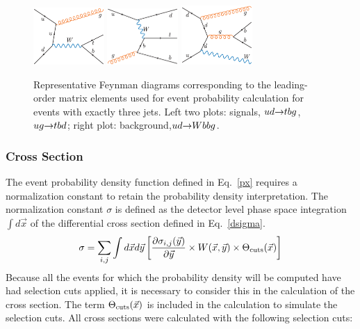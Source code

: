 \begin{figure}[!h!tbp]
\includegraphics[width=0.24\textwidth]{figures/feynman/tbg}
\hspace{0.2in}
\includegraphics[width=0.24\textwidth]{figures/feynman/tqb}
\hspace{0.2in}
\includegraphics[width=0.24\textwidth]{figures/feynman/wbbg}
\caption[3jets]{Representative Feynman diagrams corresponding to 
the leading-order matrix elements used for event probability
calculation for events with exactly three jets. Left two plots:
signals, $ud{\rightarrow}tbg$, $ug{\rightarrow}tbd$; right plot:
background,$ud{\rightarrow}Wbbg$.}
\label{3jets}
\end{figure}

\subsubsection{Cross Section}

The event probability density function defined in Eq.~\ref{px}
requires a normalization constant to retain the probability density
interpretation. The normalization constant $\sigma$ is defined as the
detector level phase space integration $\int d\vec{x}$ of the
differential cross section defined in Eq.~\ref{dsigma}.
\begin{equation}
\label{cross}
\sigma = \sum_{i,j} \int d\vec{x}d\vec{y}
\left[ \frac{\partial \sigma_{i,j}(\vec{y})}{\partial \vec{y}}
\times W(\vec{x},\vec{y})
\times \Theta_{\rm{cuts}}(\vec{x})
\right]
\end{equation}
\noindent Because all the events for which the probability density
will be computed have had selection cuts applied, it is necessary to
consider this in the calculation of the cross section. The term
$\Theta_{\rm{cuts}}(\vec{x})$ is included in the calculation to
simulate the selection cuts. All cross sections were calculated with
the following selection cuts:

